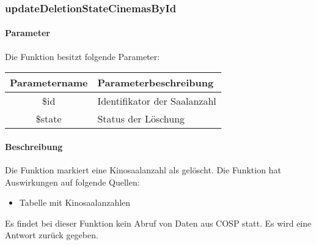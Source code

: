 \subsubsection{updateDeletionStateCinemasById}
\paragraph{Parameter} Die Funktion besitzt folgende Parameter:
\begin{table}[H]
	\begin{tabular}{|c|p{11cm}|}
		\hline
		\textbf{Parametername} & \textbf{Parameterbeschreibung} \\ \hline
		\$id    & Identifikator der Saalanzahl \\ \hline
		\$state & Status der Löschung \\ \hline
	\end{tabular}
\end{table}
\paragraph{Beschreibung} Die Funktion markiert eine Kinosaalanzahl als gelöscht. Die Funktion hat Auswirkungen auf folgende Quellen:
\begin{itemize}
	\item Tabelle mit Kinosaalanzahlen
\end{itemize}
Es findet bei dieser Funktion kein Abruf von Daten aus {\glqq COSP\grqq} statt. Es wird eine Antwort zurück gegeben.